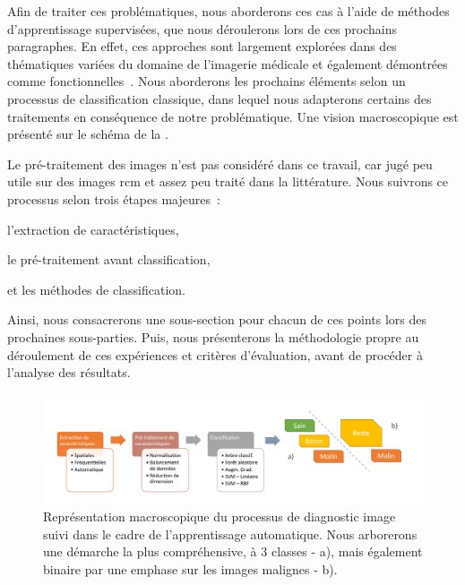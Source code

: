 Afin de traiter ces problématiques, nous aborderons ces cas à l'aide de méthodes d'apprentissage supervisées, que nous déroulerons lors de ces prochains paragraphes. En effet, ces approches sont largement explorées dans des thématiques variées du domaine de l'imagerie médicale et également démontrées comme fonctionnelles~\cite{Litjens2017,Pathan2018}. Nous aborderons les prochains éléments selon un processus de classification classique, dans lequel nous adapterons certains des traitements en conséquence de notre problématique. Une vision macroscopique est présenté sur le schéma de la .\par

Le pré-traitement des images n'est pas considéré dans ce travail, car jugé peu utile sur des images \gls{rcm} et assez peu traité dans la littérature. Nous suivrons ce processus selon trois étapes majeures~:
\begin{inlinerate}
    \item l'extraction de caractéristiques,
    \item le pré-traitement avant classification,
    \item et les méthodes de classification.
\end{inlinerate}
Ainsi, nous consacrerons une sous-section pour chacun de ces points lors des prochaines sous-parties. Puis, nous présenterons la méthodologie propre au déroulement de ces expériences et critères d'évaluation, avant de procéder à l'analyse des résultats.\par

\begin{figure}[H]
\centering
    \includegraphics[width=\linewidth]{contents/chapter_4/resources/scheme_macro_image_classification.pdf}
    \caption{Représentation macroscopique du processus de diagnostic image suivi dans le cadre de l'apprentissage automatique. Nous arborerons une démarche la plus compréhensive, à 3 classes - a), mais également binaire par une emphase sur les images malignes - b).}
    \label{fig:scheme_macro_image_classification}
\end{figure}\par

